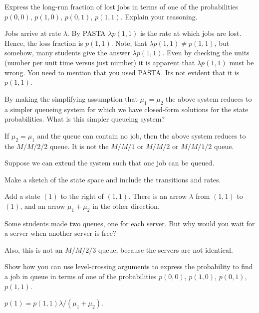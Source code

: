 \newpage

\begin{exercise}[201904, 1]
  Express the long-run fraction of lost jobs in terms of one of the probabilities $p(0,0)$, $p(1,0)$, $p(0, 1)$, $p(1, 1)$. Explain your reasoning.
\begin{solution}
  Jobs arrive at rate $\lambda$.
  By PASTA $\lambda p(1, 1)$ is the rate at which jobs are lost.
  Hence, the loss fraction is $p(1, 1)$.
  Note, that $\lambda p(1,1) \neq p(1,1)$, but somehow, many students give the answer $\lambda p(1,1)$.
  Even by checking the units (number per unit time versus just number) it is apparent that $\lambda p(1,1)$ must be wrong.
  You need to mention that you used PASTA.
  Its not evident that it is $p(1, 1)$.
\end{solution}
\end{exercise}


\begin{exercise}[201904, 1]
  By making the simplifying assumption that $\mu_1 = \mu_2$ the above system reduces to a simpler queueing system for which we have closed-form solutions for the state probabilities.
What is this simpler queueing system?
\begin{solution}
  If $\mu_2=\mu_1$ and the queue can contain no job, then the above system reduces to the $M/M/2/2$ queue. It is not the $M/M/1$ or $M/M/2$ or $M/M/1/2$ queue. 
\end{solution}
\end{exercise}


Suppose we can extend the system such that one job can be queued.

\begin{exercise}[201904, 1] Make a sketch of the state space and include the transitions and rates. 
\begin{solution}
  Add a state $(1)$ to the right of $(1,1)$. There is an arrow $\lambda$ from $(1,1)$ to $(1)$, and an arrow $\mu_1 + \mu_2$ in the other direction.

  Some students made two queues, one for each server. But why would you wait for a server when another server is free? 

  Also, this is not an $M/M/2/3$ queue, because the servers are not identical.
\end{solution}
\end{exercise}

\begin{exercise}[201904, 1]
  Show how you can use level-crossing arguments to express the probability to find a job in queue in terms of one of the probabilities $p(0,0)$, $p(1,0)$, $p(0, 1)$, $p(1, 1)$. 
\begin{solution}
$p(1) = p(1,1) \lambda /( \mu_1+\mu_2)$. 
\end{solution}
\end{exercise}


